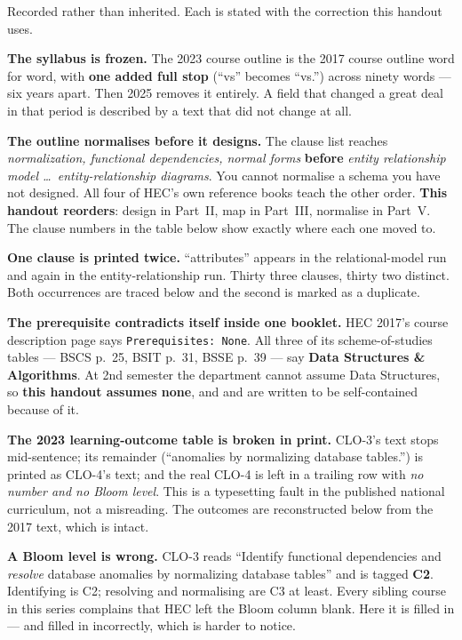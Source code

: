 \begin{alertbox}
Recorded rather than inherited. Each is stated with the correction this
handout uses.

\begin{tightnum}
  \item \textbf{The syllabus is frozen.} The 2023 course outline is the 2017
        course outline word for word, with \textbf{one added full stop}
        (``vs'' becomes ``vs.'') across ninety words --- six years apart. Then
        2025 removes it entirely. A field that changed a great deal in that
        period is described by a text that did not change at all.
  \item \textbf{The outline normalises before it designs.} The clause list
        reaches \emph{normalization, functional dependencies, normal forms}
        \textbf{before} \emph{entity relationship model \dots\
        entity-relationship diagrams}. You cannot normalise a schema you have
        not designed. All four of HEC's own reference books teach the
        other order. \textbf{This handout reorders}: design in Part~II, map in
        Part~III, normalise in Part~V. The clause numbers in the table below
        show exactly where each one moved to.
  \item \textbf{One clause is printed twice.} ``attributes'' appears in the
        relational-model run and again in the entity-relationship run. Thirty
        three clauses, thirty two distinct. Both occurrences are traced below
        and the second is marked as a duplicate.
  \item \textbf{The prerequisite contradicts itself inside one booklet.} HEC
        2017's course description page says \texttt{Prerequisites: None}. All
        three of its scheme-of-studies tables --- BSCS p.~25, BSIT p.~31, BSSE
        p.~39 --- say \textbf{Data Structures \& Algorithms}. At 2nd semester
        the department cannot assume Data Structures, so \textbf{this handout
        assumes none}, and \chref{indexes} and \chref{transactions} are written
        to be self-contained because of it.
  \item \textbf{The 2023 learning-outcome table is broken in print.} CLO-3's
        text stops mid-sentence; its remainder (``anomalies by normalizing
        database tables.'') is printed as CLO-4's text; and the real CLO-4 is
        left in a trailing row with \emph{no number and no Bloom level}. This
        is a typesetting fault in the published national curriculum, not a
        misreading. The outcomes are reconstructed below from the 2017 text,
        which is intact.
  \item \textbf{A Bloom level is wrong.} CLO-3 reads ``Identify functional
        dependencies and \emph{resolve} database anomalies by normalizing
        database tables'' and is tagged \textbf{C2}. Identifying is C2;
        resolving and normalising are C3 at least. Every sibling course in
        this series complains that HEC left the Bloom column blank. Here it is
        filled in --- and filled in incorrectly, which is harder to notice.
\end{tightnum}
\end{alertbox}

